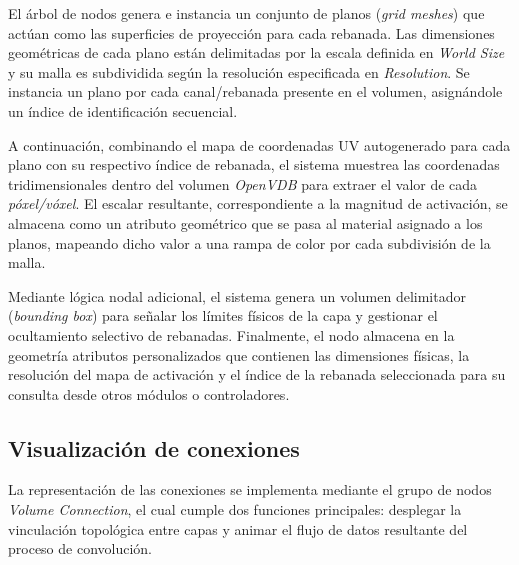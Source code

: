 El árbol de nodos genera e instancia un conjunto de planos (\textit{grid meshes}) que actúan como 
las superficies de proyección para cada rebanada. Las dimensiones geométricas de cada plano están 
delimitadas por la escala definida en \textit{World Size} y su malla es subdividida según la 
resolución especificada en \textit{Resolution}. Se instancia un plano por cada canal/rebanada 
presente en el volumen, asignándole un índice de identificación secuencial.
\medskip

A continuación, combinando el mapa de coordenadas UV autogenerado para cada plano con su respectivo 
índice de rebanada, el sistema muestrea las coordenadas tridimensionales dentro del volumen 
\textit{OpenVDB} para extraer el valor de cada \textit{póxel/vóxel}. El escalar resultante, 
correspondiente a la magnitud de activación, se almacena como un atributo geométrico que se 
pasa al material asignado a los planos, mapeando dicho valor a una rampa de color por cada 
subdivisión de la malla.
\medskip

Mediante lógica nodal adicional, el sistema genera un volumen delimitador (\textit{bounding box}) 
para señalar los límites físicos de la capa y gestionar el ocultamiento selectivo de rebanadas. 
Finalmente, el nodo almacena en la geometría atributos personalizados que contienen las dimensiones 
físicas, la resolución del mapa de activación y el índice de la rebanada seleccionada para su consulta desde 
otros módulos o controladores.

\subsection{Visualización de conexiones}
La representación de las conexiones se implementa mediante el grupo de nodos 
\textit{Volume Connection}, el cual cumple dos funciones principales: desplegar la vinculación 
topológica entre capas y animar el flujo de datos resultante del proceso de convolución.
\medskip

